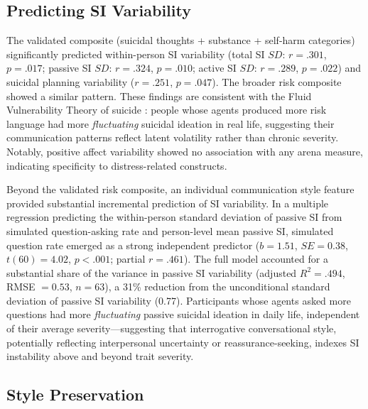\documentclass[review,12pt,authoryear]{elsarticle}
\begin{document}
\subsection{Predicting SI Variability}

The validated composite (suicidal thoughts + substance + self-harm categories) significantly predicted within-person SI variability (total SI $SD$: $r = .301$, $p = .017$; passive SI $SD$: $r = .324$, $p = .010$; active SI $SD$: $r = .289$, $p = .022$) and suicidal planning variability ($r = .251$, $p = .047$). The broader risk composite showed a similar pattern. These findings are consistent with the Fluid Vulnerability Theory of suicide \citep{bryan2018nonlinear}: people whose agents produced more risk language had more \textit{fluctuating} suicidal ideation in real life, suggesting their communication patterns reflect latent volatility rather than chronic severity. Notably, positive affect variability showed no association with any arena measure, indicating specificity to distress-related constructs.

Beyond the validated risk composite, an individual communication style feature provided substantial incremental prediction of SI variability. In a multiple regression predicting the within-person standard deviation of passive SI from simulated question-asking rate and person-level mean passive SI, simulated question rate emerged as a strong independent predictor ($b = 1.51$, $SE = 0.38$, $t(60) = 4.02$, $p < .001$; partial $r = .461$). The full model accounted for a substantial share of the variance in passive SI variability (adjusted $R^2 = .494$, RMSE $= 0.53$, $n = 63$), a 31\% reduction from the unconditional standard deviation of passive SI variability (0.77). Participants whose agents asked more questions had more \textit{fluctuating} passive suicidal ideation in daily life, independent of their average severity---suggesting that interrogative conversational style, potentially reflecting interpersonal uncertainty or reassurance-seeking, indexes SI instability above and beyond trait severity.

\subsection{Style Preservation}
\end{document}
